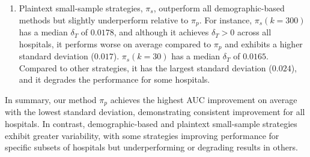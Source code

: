 \begin{enumerate}
\item Plaintext small-sample strategies, $\pi_s$, outperform all demographic-based methods but slightly underperform relative to $\pi_p$. For instance, $\pi_s(k=300)$ has a median $\delta_T$ of $0.0178$, and although it achieves $\delta_T > 0$ across all hospitals, it performs worse on average compared to $\pi_p$ and exhibits a higher standard deviation ($0.017$).
$\pi_s(k=30)$ has a median $\delta_T$ of $0.0165$. Compared to other strategies, it has the largest standard deviation ($0.024$), and it degrades the performance for some hospitals.

\end{enumerate}

In summary, our method $\pi_p$ achieves the highest AUC improvement on average with the lowest standard deviation, demonstrating consistent improvement for all hospitals. In contrast, demographic-based and plaintext small-sample strategies exhibit greater variability, with some strategies improving performance for specific subsets of hospitals but underperforming or degrading results in others.
 
